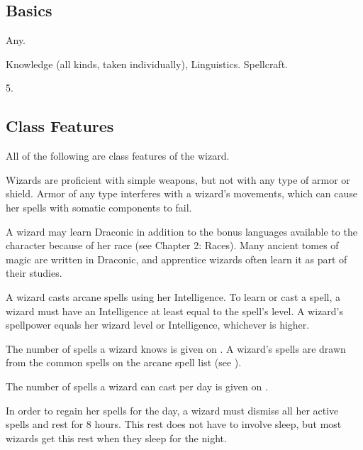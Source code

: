 \subsection{Basics}

 Any.

 Knowledge (all kinds, taken individually), Linguistics.
 Spellcraft.

 5.

\subsection{Class Features}

All of the following are class features of the wizard.

Wizards are proficient with simple weapons, but not with any type of armor or shield.
Armor of any type interferes with a wizard's movements, which can cause her spells with somatic components to fail.

A wizard may learn Draconic in addition to the bonus languages available to the character because of her race (see Chapter 2: Races).
Many ancient tomes of magic are written in Draconic, and apprentice wizards often learn it as part of their studies.

A wizard casts arcane spells using her Intelligence.
To learn or cast a spell, a wizard must have an Intelligence at least equal to the spell's level.
A wizard's spellpower equals her wizard level or Intelligence, whichever is higher.

The number of spells a wizard knows is given on .
A wizard's spells are drawn from the common spells on the arcane spell list (see ).

The number of spells a wizard can cast per day is given on .

In order to regain her spells for the day, a wizard must dismiss all her active spells and rest for 8 hours.
This rest does not have to involve sleep, but most wizards get this rest when they sleep for the night.

